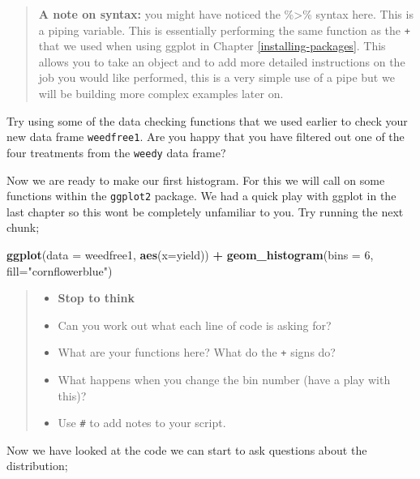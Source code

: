\documentclass[
]{book}
\newenvironment{Shaded}{\begin{snugshade}}{\end{snugshade}}
\newcommand{\AttributeTok}[1]{\textcolor[rgb]{0.13,0.29,0.53}{#1}}
\newcommand{\DecValTok}[1]{\textcolor[rgb]{0.00,0.00,0.81}{#1}}
\newcommand{\FunctionTok}[1]{\textcolor[rgb]{0.13,0.29,0.53}{\textbf{#1}}}
\newcommand{\NormalTok}[1]{#1}
\newcommand{\SpecialCharTok}[1]{\textcolor[rgb]{0.81,0.36,0.00}{\textbf{#1}}}
\newcommand{\StringTok}[1]{\textcolor[rgb]{0.31,0.60,0.02}{#1}}
\providecommand{\tightlist}{%
  \setlength{\itemsep}{0pt}\setlength{\parskip}{0pt}}
\begin{document}
\begin{quote}
\textbf{A note on syntax:} you might have noticed the \%\textgreater\% syntax here. This is a piping variable. This is essentially performing the same function as the \texttt{+} that we used when using ggplot in Chapter \ref{installing-packages}. This allows you to take an object and to add more detailed instructions on the job you would like performed, this is a very simple use of a pipe but we will be building more complex examples later on.
\end{quote}

Try using some of the data checking functions that we used earlier to check your new data frame \texttt{weedfree1}. Are you happy that you have filtered out one of the four treatments from the \texttt{weedy} data frame?

Now we are ready to make our first histogram. For this we will call on some functions within the \texttt{ggplot2} package. We had a quick play with ggplot in the last chapter so this wont be completely unfamiliar to you. Try running the next chunk;

\begin{Shaded}
\begin{Highlighting}[]
\FunctionTok{ggplot}\NormalTok{(}\AttributeTok{data =}\NormalTok{ weedfree1, }\FunctionTok{aes}\NormalTok{(}\AttributeTok{x=}\NormalTok{yield)) }\SpecialCharTok{+}
  \FunctionTok{geom\_histogram}\NormalTok{(}\AttributeTok{bins =} \DecValTok{6}\NormalTok{, }\AttributeTok{fill=}\StringTok{"cornflowerblue"}\NormalTok{)}
\end{Highlighting}
\end{Shaded}

\begin{quote}
\begin{itemize}
\tightlist
\item
  \textbf{Stop to think}
\item
  Can you work out what each line of code is asking for?
\item
  What are your functions here? What do the \texttt{+} signs do?
\item
  What happens when you change the bin number (have a play with this)?
\item
  Use \texttt{\#} to add notes to your script.
\end{itemize}
\end{quote}

Now we have looked at the code we can start to ask questions about the distribution;
\end{document}
